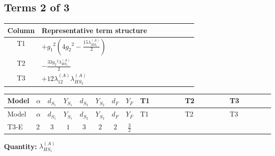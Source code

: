 \documentclass[8pt]{article}
\begin{document}
\begin{landscape}
\subsection*{Terms 2 of 3}
\begin{center}
\begin{tabular}{@{}c >{\raggedright\arraybackslash}p{0.82\linewidth}@{}}
\toprule
Column & Representative term structure \\
\midrule
T1 & \(\displaystyle +{g_1}^2 \left(4 {g_2}^2-\frac{15 {\lambda_{HS_1}^{(A)}}}{2}\right)\) \\
\midrule
T2 & \(\displaystyle -\frac{33 {g_2}^2 {\lambda_{HS_1}^{(A)}}}{2}\) \\
\midrule
T3 & \(\displaystyle +12 {\lambda_{12}^{(A)}} {\lambda_{HS_2}^{(A)}}\) \\
\midrule
\bottomrule
\end{tabular}
\end{center}
\smallskip
\tiny
\begin{longtable}{@{}llcccccc >{\raggedright\arraybackslash}p{0.21\linewidth} >{\raggedright\arraybackslash}p{0.21\linewidth} >{\raggedright\arraybackslash}p{0.21\linewidth}@{}}
\toprule
Model & $\alpha$ & $d_{S_1}$ & $Y_{S_1}$ & $d_{S_2}$ & $Y_{S_2}$ & $d_F$ & $Y_F$ & T1 & T2 & T3 \\
\midrule
\endfirsthead
\toprule
Model & $\alpha$ & $d_{S_1}$ & $Y_{S_1}$ & $d_{S_2}$ & $Y_{S_2}$ & $d_F$ & $Y_F$ & T1 & T2 & T3 \\
\midrule
\endhead
T3-E & $2$ & $3$ & $1$ & $3$ & $2$ & $2$ & $\frac{3}{2}$ & \scriptsize\adjustbox{max width=\linewidth}{$\begin{gathered} +{g_1}^2 \left(4 {g_2}^2-\frac{15 {\lambda_{HS_1}^{(A)}}}{2}\right)\end{gathered}$} & \scriptsize\adjustbox{max width=\linewidth}{$\begin{gathered} -\frac{33 {g_2}^2 {\lambda_{HS_1}^{(A)}}}{2}\end{gathered}$} & \scriptsize\adjustbox{max width=\linewidth}{$\begin{gathered} +12 {\lambda_{12}^{(A)}} {\lambda_{HS_2}^{(A)}}\end{gathered}$} \\
\midrule
\bottomrule
\end{longtable}
\clearpage
\noindent\textbf{Quantity: }$\lambda_{HS_1}^{(A)}$\par\smallskip

\end{landscape}
\end{document}
